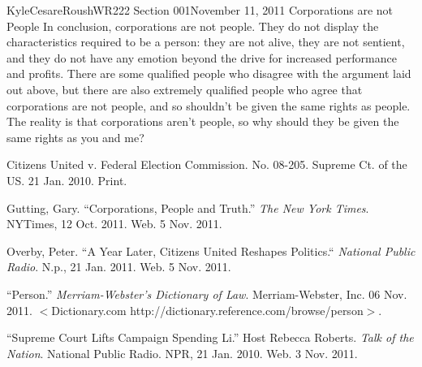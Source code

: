 \documentclass[12pt,letterpaper]{article}
\begin{document}
\begin{mla}{Kyle}{Cesare}{Roush}{WR222 Section 001}{November 11, 2011}{
Corporations are not People}
In conclusion, corporations are not people.  They do not display the
characteristics required to be a person: they are not alive, they are not
sentient, and they do not have any emotion beyond the drive for increased
performance and profits.  There are some qualified people who disagree with the
argument laid out above, but there are also extremely qualified people who agree
that corporations are not people, and so shouldn't be given the same rights as
people.  The reality is that corporations aren't people, so why should they be
given the same rights as you and me?

\begin{workscited}


\bibent Citizens United v. Federal Election Commission.  No. 08-205.  Supreme
Ct. of the US.  21 Jan. 2010.  Print.

\bibent Gutting, Gary. ``Corporations, People and Truth.'' \emph{The New York
Times}.  NYTimes, 12 Oct. 2011. Web. 5 Nov. 2011. 

\bibent Overby, Peter. ``A Year Later, Citizens United Reshapes Politics.``
\emph{National Public Radio}. N.p., 21 Jan. 2011. Web. 5 Nov. 2011.

\bibent ``Person.'' \emph{Merriam-Webster's Dictionary of Law}. Merriam-Webster,
Inc. 06 Nov. 2011. $<$Dictionary.com
http://dictionary.reference.com/browse/person$>$.

\bibent ``Supreme Court Lifts Campaign Spending Li.'' Host Rebecca Roberts.
\emph{Talk of the Nation}. National Public Radio. NPR, 21 Jan. 2010. Web. 3 Nov.
2011. 

\end{workscited}
\end{mla}
\end{document}
